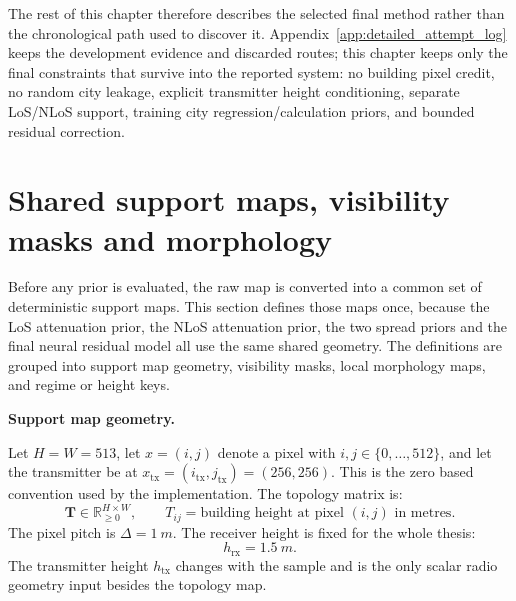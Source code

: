 The rest of this chapter therefore describes the selected final method rather
than the chronological path used to discover it.
Appendix~\ref{app:detailed_attempt_log} keeps the development evidence and
discarded routes; this chapter keeps only the final
constraints that survive into the reported system: no building pixel credit, no
random city leakage, explicit transmitter height conditioning, separate
LoS/NLoS support, training city regression/calculation priors, and bounded
residual correction.

\section{Shared support maps, visibility masks and morphology}
\label{sec:support_geometry_morphology}

Before any prior is evaluated, the raw map is converted into a common set of
deterministic support maps. This section defines those maps once, because
the LoS attenuation prior, the NLoS attenuation prior, the two spread priors and
the final neural residual model all use the same shared geometry. The
definitions are grouped into support map geometry, visibility masks, local
morphology maps, and regime or height keys.

\par\smallskip
\noindent\textbf{Support map geometry.}\par
\noindent
Let \(H=W=513\), let \(x=(i,j)\) denote a pixel with
\(i,j\in\{0,\ldots,512\}\), and let the transmitter be at
\(x_{\mathrm{tx}}=(i_{\mathrm{tx}},j_{\mathrm{tx}})=(256,256)\). This is the
zero based convention used by the implementation. The topology matrix is:
\begin{equation}
  \mathbf{T}\in\mathbb{R}_{\ge 0}^{H\times W},
  \qquad
  T_{ij}= \text{building height at pixel }(i,j)\text{ in metres}.
  \label{eq:topology_matrix}
\end{equation}
The pixel pitch is \(\Delta=\SI{1}{m}\). The receiver height is fixed for the
whole thesis:
\begin{equation}
  h_{\mathrm{rx}}=\SI{1.5}{m}.
  \label{eq:fixed_rx_height}
\end{equation}
The transmitter height \(h_{\mathrm{tx}}\) changes with the sample and is the
only scalar radio geometry input besides the topology map.

